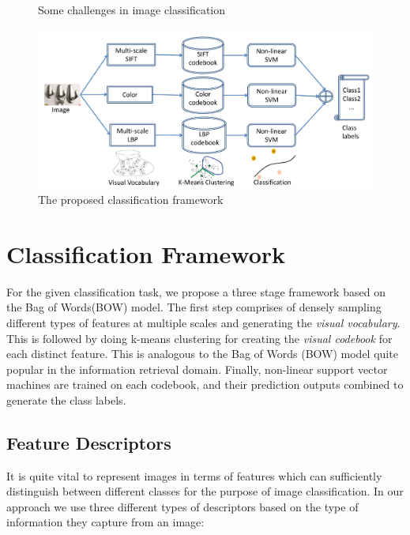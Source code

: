 \documentclass[12pt]{article}
\begin{document}
\begin{figure}
{\label{fig1:subfig3}
}
\caption{Some challenges in image classification}
\end{figure}

\begin{figure}
\includegraphics[width = 1\textwidth]{flowchart}
\caption{The proposed classification framework}
\end{figure}

\section{Classification Framework}
For the given classification task, we propose a three stage framework based on the Bag of Words(BOW) model. The first step comprises of densely sampling different types of features at multiple scales and generating the \textit{visual vocabulary}. This is followed by doing k-means clustering for creating the \textit{visual codebook} for each distinct feature. This is analogous to the Bag of Words (BOW) model quite popular in the information retrieval domain. Finally, non-linear support vector machines are trained on each codebook, and their prediction outputs combined to generate the class labels.

\subsection{Feature Descriptors}
It is quite vital to represent images in terms of features which can sufficiently distinguish between different classes for the purpose of image classification. In our approach we use three different types of descriptors based on the type of information they capture from an image:
\end{document}
